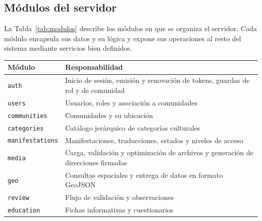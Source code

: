 \subsection{Módulos del servidor}
La Tabla~\ref{tab:modulos} describe los módulos en que se organiza el servidor. Cada módulo encapsula sus datos y su lógica y expone sus operaciones al resto del sistema mediante servicios bien definidos.

{\centering\singlespacing
  \label{tab:modulos}
  \begin{tabular}{|p{}|p{}|}
    \hline
    \textbf{Módulo} & \textbf{Responsabilidad} \tabularnewline
    \hline
    \raggedright\hspace{0pt}\texttt{auth} & \raggedright\hspace{0pt}Inicio de sesión, emisión y renovación de tokens, guardas de rol y de comunidad \tabularnewline
    \hline
    \raggedright\hspace{0pt}\texttt{users} & \raggedright\hspace{0pt}Usuarios, roles y asociación a comunidades \tabularnewline
    \hline
    \raggedright\hspace{0pt}\texttt{communities} & \raggedright\hspace{0pt}Comunidades y su ubicación \tabularnewline
    \hline
    \raggedright\hspace{0pt}\texttt{categories} & \raggedright\hspace{0pt}Catálogo jerárquico de categorías culturales \tabularnewline
    \hline
    \raggedright\hspace{0pt}\texttt{manifestations} & \raggedright\hspace{0pt}Manifestaciones, traducciones, estados y niveles de acceso \tabularnewline
    \hline
    \raggedright\hspace{0pt}\texttt{media} & \raggedright\hspace{0pt}Carga, validación y optimización de archivos y generación de direcciones firmadas \tabularnewline
    \hline
    \raggedright\hspace{0pt}\texttt{geo} & \raggedright\hspace{0pt}Consultas espaciales y entrega de datos en formato GeoJSON \tabularnewline
    \hline
    \raggedright\hspace{0pt}\texttt{review} & \raggedright\hspace{0pt}Flujo de validación y observaciones \tabularnewline
    \hline
    \raggedright\hspace{0pt}\texttt{education} & \raggedright\hspace{0pt}Fichas informativas y cuestionarios \tabularnewline

\end{tabular}}
